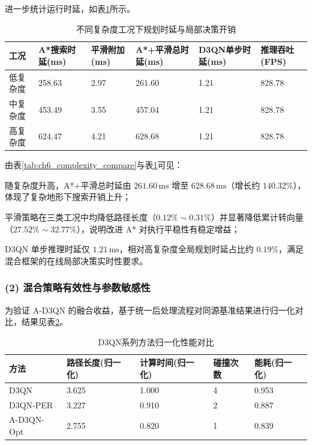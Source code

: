 进一步统计运行时延，如表\ref{tab:ch6_runtime_compare}所示。

\begin{table}[H]
\centering
\small
\caption{不同复杂度工况下规划时延与局部决策开销}
\label{tab:ch6_runtime_compare}
\setlength{\tabcolsep}{3pt}
\begin{tabular}{p{}p{}p{}p{}p{}p{}}
\toprule
工况 & A*搜索时延(ms) & 平滑附加(ms) & A*+平滑总时延(ms) & D3QN单步时延(ms) & 推理吞吐(FPS) \\
\midrule
低复杂度 & 258.63 & 2.97 & 261.60 & 1.21 & 828.78 \\
中复杂度 & 453.49 & 3.55 & 457.04 & 1.21 & 828.78 \\
高复杂度 & 624.47 & 4.21 & 628.68 & 1.21 & 828.78 \\
\bottomrule
\end{tabular}
\end{table}

由表\ref{tab:ch6_complexity_compare}与表\ref{tab:ch6_runtime_compare}可见：
\begin{myitemize}
\item 随复杂度升高，A*+平滑总时延由 $261.60\,\mathrm{ms}$ 增至 $628.68\,\mathrm{ms}$（增长约 $140.32\%$），体现了复杂地形下搜索开销上升；
\item 平滑策略在三类工况中均降低路径长度（$0.12\%\sim0.31\%$）并显著降低累计转向量（$27.52\%\sim32.77\%$），说明改进 A* 对执行平稳性有稳定增益；
\item D3QN 单步推理时延仅 $1.21\,\mathrm{ms}$，相对高复杂度全局规划时延占比约 $0.19\%$，满足混合框架的在线局部决策实时性要求。
\end{myitemize}

\subsubsection*{(2) 混合策略有效性与参数敏感性}

为验证 A-D3QN 的融合收益，基于统一后处理流程对同源基准结果进行归一化对比，结果见表\ref{tab:ch6_method_compare_norm}。

\begin{table}[H]
\centering
\small
\caption{D3QN系列方法归一化性能对比}
\label{tab:ch6_method_compare_norm}
\begin{tabular}{p{}p{}p{}p{}p{}}
\toprule
方法 & 路径长度(归一化) & 计算时间(归一化) & 碰撞次数 & 能耗(归一化) \\
\midrule
D3QN & 3.625 & 1.000 & 4 & 0.953 \\
D3QN-PER & 3.227 & 0.910 & 2 & 0.887 \\
A-D3QN-Opt & 2.755 & 0.820 & 1 & 0.839 \\
\bottomrule
\end{tabular}
\end{table}

